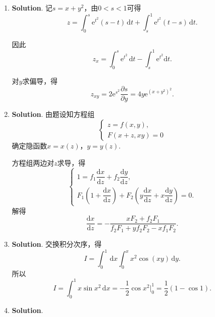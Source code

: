 \documentclass[../main.tex]{subfiles}
\begin{document}
\begin{enumerate}
    \item \textbf{Solution}. 记$s=x+y^{2}$，由$0<s<1$可得
          \[
              z=\int_{0}^{s}\mathrm{e}^{t^{2}}(s-t)\,\mathrm{d}t+\int_{s}^{1}\mathrm{e}^{t^{2}}
              (t-s)\,\mathrm{d}t.
          \]

          因此
          \[
              z_{x}=\int_{0}^{s}\mathrm{e}^{t^{2}}\,\mathrm{d}t-\int_{s}^{1}\mathrm{e}^{t^{2}}
              \mathrm{d}t.
          \]

          对$y$求偏导，得
          \[
              z_{xy}=2\mathrm{e}^{s^{2}}\frac{\partial s}{\partial y}=4y\mathrm{e}^{(x+y^{2})^{2}}
              .
          \]

    \item \textbf{Solution}. 由题设知方程组
          \[
              \begin{cases}
                  z=f(x,y), \\
                  F(x+z,xy)=0
              \end{cases}
          \]
          确定隐函数$x=x(z)$，$y=y(z)$.

          方程组两边对$z$求导，得
          \[
              \begin{cases}
                  1=f_{1}\dfrac{\mathrm{d}x}{\mathrm{d}z}+f_{2}\dfrac{\mathrm{d}y}{\mathrm{d}z}, \\[8pt]
                  F_{1}\left(1+\dfrac{\mathrm{d}x}{\mathrm{d}z}\right) +F_{2}\left(y\dfrac{\mathrm{d}x}{\mathrm{d}z}+x\dfrac{\mathrm{d}y}{\mathrm{d}z}\right)=0.
              \end{cases}
          \]
          解得
          \[
              \frac{\mathrm{d}x}{\mathrm{d}z}=-\frac{xF_{2}+f_{2}F_{1}}{f_{2}F_{1}+yf_{2}F_{2}-xf_{1}F_{2}}
              .
          \]

    \item \textbf{Solution}. 交换积分次序，得
          \[
              I=\int_{0}^{1}\,\mathrm{d}x\int_{0}^{x}x^{2}\cos(xy)\,\mathrm{d}y.
          \]
          所以
          \[
              I=\int_{0}^{1}x\sin x^{2}\,\mathrm{d}x =-\frac{1}{2}\cos x^{2}\bigg|_{0}^{1}
              =\frac{1}{2}(1-\cos1).
          \]

    \item \textbf{Solution}.


\end{enumerate}
\end{document}
